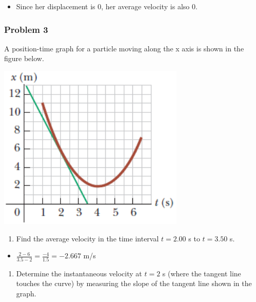 \documentclass[
  letterpaper,
  DIV=11,
  numbers=noendperiod]{scrartcl}
\providecommand{\tightlist}{%
  \setlength{\itemsep}{0pt}\setlength{\parskip}{0pt}}\usepackage{longtable,booktabs,array}
\begin{document}
\begin{itemize}
\tightlist
\item
  Since her displacement is 0, her average velocity is also 0.
\end{itemize}

\newpage{}

\hypertarget{problem-3}{%
\subsubsection{Problem 3}\label{problem-3}}

A position-time graph for a particle moving along the x axis is shown in
the figure below.

\includegraphics{img/Kinematics Velocity and Position HW/problem3.png}

\begin{enumerate}
\def\labelenumi{(\alph{enumi})}
\tightlist
\item
  Find the average velocity in the time interval \(t = 2.00\) s to
  \(t = 3.50\) s.
\end{enumerate}

\begin{itemize}
\tightlist
\item
  \(\frac{2-6}{3.5-2}=\frac{-4}{1.5}=-2.667\) m/s
\end{itemize}

\begin{enumerate}
\def\labelenumi{(\alph{enumi})}
\setcounter{enumi}{1}
\tightlist
\item
  Determine the instantaneous velocity at \(t = 2\) s (where the tangent
  line touches the curve) by measuring the slope of the tangent line
  shown in the graph.
\end{enumerate}
\end{document}
